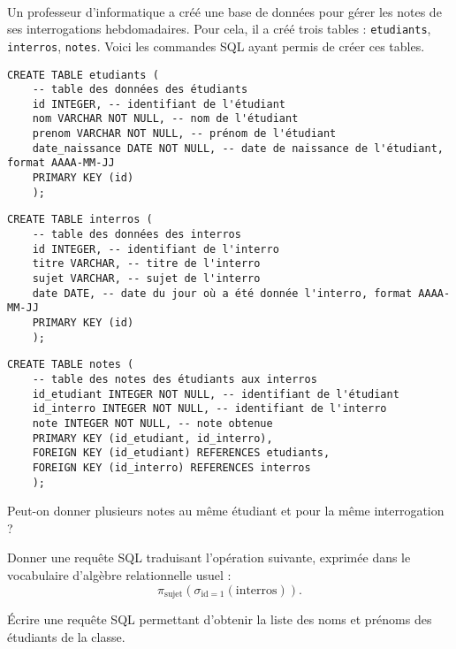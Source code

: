 \exer{[SQL-002]}
\setcounter{numques}{0}~\\

Un professeur d'informatique a créé une base de données pour gérer les notes de ses interrogations hebdomadaires. 
Pour cela, il a créé trois tables : \texttt{etudiants}, \texttt{interros}, \texttt{notes}. 
Voici les commandes SQL ayant permis de créer ces tables. 

\begin{lstlisting}
CREATE TABLE etudiants (
    -- table des données des étudiants
    id INTEGER, -- identifiant de l'étudiant
    nom VARCHAR NOT NULL, -- nom de l'étudiant
    prenom VARCHAR NOT NULL, -- prénom de l'étudiant
    date_naissance DATE NOT NULL, -- date de naissance de l'étudiant, format AAAA-MM-JJ
    PRIMARY KEY (id)
    );
\end{lstlisting}

\begin{lstlisting}
CREATE TABLE interros (
    -- table des données des interros
    id INTEGER, -- identifiant de l'interro
    titre VARCHAR, -- titre de l'interro
    sujet VARCHAR, -- sujet de l'interro
    date DATE, -- date du jour où a été donnée l'interro, format AAAA-MM-JJ
    PRIMARY KEY (id)
    );
\end{lstlisting}

\begin{lstlisting}
CREATE TABLE notes (
    -- table des notes des étudiants aux interros
    id_etudiant INTEGER NOT NULL, -- identifiant de l'étudiant
    id_interro INTEGER NOT NULL, -- identifiant de l'interro
    note INTEGER NOT NULL, -- note obtenue
    PRIMARY KEY (id_etudiant, id_interro),
    FOREIGN KEY (id_etudiant) REFERENCES etudiants,
    FOREIGN KEY (id_interro) REFERENCES interros
    );
\end{lstlisting}

\medskip{}

\question{} Peut-on donner plusieurs notes au même étudiant et pour la même interrogation ? 

\medskip{}

\question{} Donner une requête SQL traduisant l'opération suivante, exprimée dans le vocabulaire d'algèbre relationnelle usuel : 
\begin{equation*}
  \pi_{\text{sujet}}\left(\sigma_{\text{id}=1}(\text{interros})\right).
\end{equation*}

\medskip{}

\question{} Écrire une requête SQL permettant d'obtenir la liste des noms et prénoms des étudiants de la classe. 

